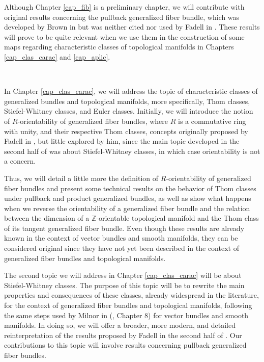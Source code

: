 \documentclass[12pt,oneside]{book}
\newcommand{\Z}{\mathbb{Z}}
\begin{document}
    Although Chapter \ref{cap_fib} is a preliminary chapter, we will contribute with original results 
    concerning the pullback generalized fiber bundle, which was developed by Brown in \cite{brown} but was 
    neither cited nor used by Fadell in \cite{fadell_1}. These results will prove to be quite relevant 
    when we use them in the construction of some maps regarding characteristic classes of topological 
    manifolds in Chapters \ref{cap_clas_carac} and \ref{cap_aplic}.

    \

    In Chapter \ref{cap_clas_carac}, we will address the topic of characteristic classes of generalized 
    bundles and topological manifolds, more specifically, Thom classes, Stiefel-Whitney classes, and 
    Euler classes. Initially, we will introduce the notion of $R$-orientability of generalized fiber bundles, 
    where $R$ is a commutative ring with unity, and their respective Thom classes, concepts originally 
    proposed by Fadell in \cite{fadell_1}, but little explored by him, since the main topic developed 
    in the second half of \cite{fadell_1} was about Stiefel-Whitney classes, in which case orientability 
    is not a concern.

    Thus, we will detail a little more the definition of $R$-orientability of generalized fiber bundles and 
    present some technical results on the behavior of Thom classes under pullback and product generalized 
    bundles, as well as show what happens when we reverse the orientability of a generalized fiber bundle and 
    the relation between the dimension of a $\Z$-orientable topological manifold and the Thom class of 
    its tangent generalized fiber bundle. Even though these results are already known in the context of vector 
    bundles and smooth manifolds, they can be considered original since they have not yet been described 
    in the context of generalized fiber bundles and topological manifolds.

    The second topic we will address in Chapter \ref{cap_clas_carac} will be about Stiefel-Whitney 
    classes. The purpose of this topic will be to rewrite the main properties and consequences of these 
    classes, already widespread in the literature, for the context of generalized fiber bundles and topological 
    manifolds, following the same steps used by Milnor in (\cite{milnor_1}, Chapter 8) for vector bundles 
    and smooth manifolds. In doing so, we will offer a broader, more modern, and detailed reinterpretation 
    of the results proposed by Fadell in the second half of \cite{fadell_1}. Our contributions to this 
    topic will involve results concerning pullback generalized fiber bundles.
\end{document}
